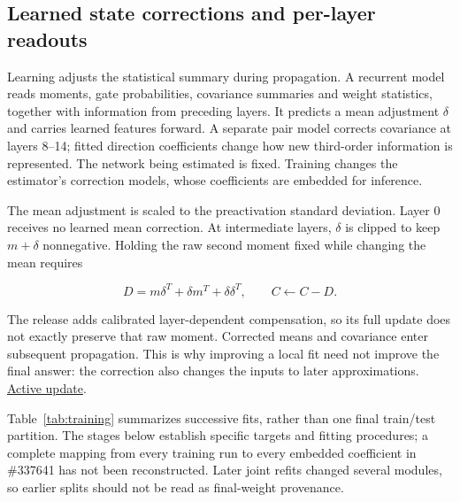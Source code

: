 \documentclass[11pt,letterpaper]{article}
\begin{document}
\subsection{Learned state corrections and per-layer readouts}\label{learned-state-corrections-and-per-layer-readouts}

Learning adjusts the statistical summary during propagation. A recurrent model reads moments, gate probabilities, covariance summaries and weight statistics, together with information from preceding layers. It predicts a mean adjustment \(\delta\) and carries learned features forward. A separate pair model corrects covariance at layers 8--14; fitted direction coefficients change how new third-order information is represented. The network being estimated is fixed. Training changes the estimator's correction models, whose coefficients are embedded for inference.

The mean adjustment is scaled to the preactivation standard deviation. Layer 0 receives no learned mean correction. At intermediate layers, \(\delta\) is clipped to keep \(m+\delta\) nonnegative. Holding the raw second moment fixed while changing the mean requires

\begin{equation}
D=m\delta^T+\delta m^T+\delta\delta^T,\qquad C\leftarrow C-D.
\end{equation}

The release adds calibrated layer-dependent compensation, so its full update does not exactly preserve that raw moment. Corrected means and covariance enter subsequent propagation. This is why improving a local fit need not improve the final answer: the correction also changes the inputs to later approximations. \href{https://github.com/mattliston/arc-whitebox-estimation-challenge/blob/main/submissions/337641/estimator.py\#L24809}{Active update}.

Table~\ref{tab:training} summarizes successive fits, rather than one final train/test partition. The stages below establish specific targets and fitting procedures; a complete mapping from every training run to every embedded coefficient in \#337641 has not been reconstructed. Later joint refits changed several modules, so earlier splits should not be read as final-weight provenance.
\end{document}

